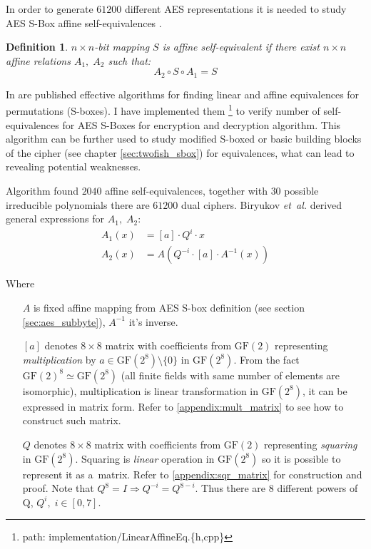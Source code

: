 \documentclass[11pt,oneside,final]{fithesis2}
\newtheorem{mydef}{Definition}
\newcommand{\gfe}{\ensuremath{\text{GF}\left(2^8\right)}}
\newcommand{\gf}{\ensuremath{\text{GF}\left(2\right)}}
\begin{document}
	In order to generate $61200$ different AES representations it is needed to study AES S-Box affine self-equivalences \citep{Biryukov:2003:TCL:1766171.1766175}. 
		
	\begin{mydef}
	$n \times n$-bit mapping $S$ is affine self-equivalent if there exist $n \times n$ affine relations $A_1,\;A_2$ such that: 
	\begin{equation}\label{eq:selfeq}
	A_2 \circ S \circ A_1 = S 
	\end{equation}
	\end{mydef}
	
	In \citep{Biryukov:2003:TCL:1766171.1766175} are published effective algorithms for finding linear and affine equivalences for permutations (S-boxes). I have implemented
	them \footnote{path: implementation/LinearAffineEq.\{h,cpp\}} to verify number of self-equivalences for AES S-Boxes for encryption and decryption algorithm. 
	This algorithm can be further used to study modified S-boxed or basic building blocks of the cipher (see chapter \ref{sec:twofish_sbox}) for equivalences, what can lead
	to revealing potential weaknesses.
	
	Algorithm found $2040$ affine self-equivalences, together with $30$ possible irreducible polynomials there are $61200$ dual ciphers.
	Biryukov \emph{et~al.} derived general expressions for $A_1,\;A_2$:
	\begin{subequations}
	\begin{align}
	    A_1(x) &= \left[a\right] \cdot Q^i \cdot x\\
	    A_2(x) &= A\left( Q^{-i} \cdot \left[a\right] \cdot A^{-1}\left(x\right) \right)
	\end{align}
	\end{subequations}
	
	Where
	\begin{itemize}[leftmargin=5em]
	 \item[{$A$}] is fixed affine mapping from AES S-box definition (see section \ref{sec:aes_subbyte}), $A^{-1}$ it's inverse.
	 \item[{$[a]$}] denotes $8 \times 8$ matrix with coefficients from $\gf$ representing \emph{multiplication} by $a \in \gfe \setminus \{0\}$ in $\gfe$. 
	    From the fact $\gf^8 \simeq \gfe$ (all finite fields with same number of elements are isomorphic), multiplication is
	    linear transformation in $\gfe$, it can be expressed in matrix form. Refer to \ref{appendix:mult_matrix} to see how to construct such matrix.
	 \item[{$Q$}] denotes $8 \times 8$ matrix with coefficients from $\gf$ representing \emph{squaring} in $\gfe$. Squaring is \emph{linear} operation
	    in $\gfe$ so it is possible to represent it as a~matrix. Refer to \ref{appendix:sqr_matrix} for construction and proof. Note that 
	    $Q^8 = I \Rightarrow Q^{-i} = Q^{8-i}$. Thus there are 8 different powers of Q, $Q^{i}, \; i \in [0,7]$.
	\end{itemize}
	
\end{document}
